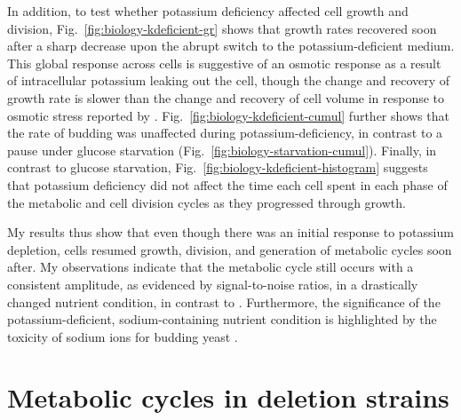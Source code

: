 In addition, to test whether potassium deficiency affected cell growth and division, Fig.\ \ref{fig:biology-kdeficient-gr} shows that growth rates recovered soon after a sharp decrease upon the abrupt switch to the potassium-deficient medium.
This global response across cells is suggestive of an osmotic response as a result of intracellular potassium leaking out the cell, though the change and recovery of growth rate is slower than the change and recovery of cell volume in response to osmotic stress reported by \textcite{granadosDistributingTasksMultiple2017}.
Fig.\ \ref{fig:biology-kdeficient-cumul} further shows that the rate of budding was unaffected during potassium-deficiency, in contrast to a pause under glucose starvation (Fig.\ \ref{fig:biology-starvation-cumul}).
Finally, in contrast to glucose starvation, Fig.\ \ref{fig:biology-kdeficient-histogram} suggests that potassium deficiency did not affect the time each cell spent in each phase of the metabolic and cell division cycles as they progressed through growth.

My results thus show that even though there was an initial response to potassium depletion, cells resumed growth, division, and generation of metabolic cycles soon after.
My observations indicate that the metabolic cycle still occurs with a consistent amplitude, as evidenced by signal-to-noise ratios, in a drastically changed nutrient condition, in contrast to \textcite{oneillEukaryoticCellBiology2020}.
Furthermore, the significance of the potassium-deficient, sodium-containing nutrient condition is highlighted by the toxicity of sodium ions for budding yeast \parencite{arinoAlkaliMetalCation2010,caseyEffectSaltsCofermentation2013,watcharawipasSodiumAcetateResponses2018}.


\section{Metabolic cycles in deletion strains}
\label{sec:biology-deletions}


